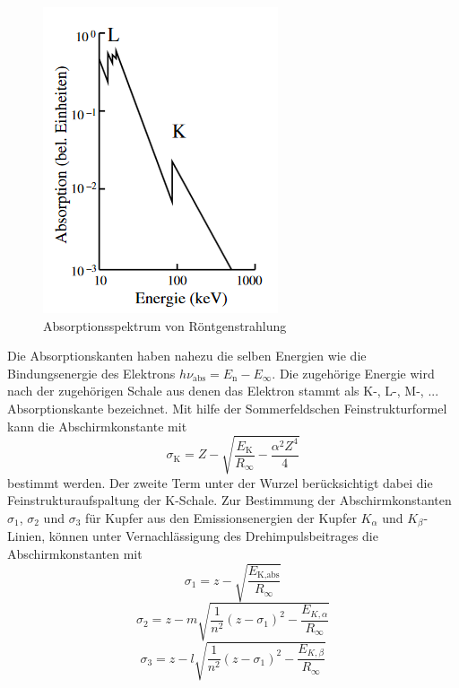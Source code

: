 \begin{figure}
    \centering
    \caption{Absorptionsspektrum von Röntgenstrahlung \cite{V602}}
    \label{fig:abso}
    \includegraphics[width = 0.6 \textwidth]{pics/abso.png}
\end{figure}
Die Absorptionskanten haben nahezu die selben Energien wie die Bindungsenergie des Elektrons $h \nu_\text{abs}= E_\text{n} - E_{\infty}$. Die zugehörige Energie wird nach der zugehörigen Schale aus denen das Elektron stammt als K-, L-, M-, ... Absorptionskante bezeichnet. 
Mit hilfe der Sommerfeldschen Feinstrukturformel kann die Abschirmkonstante mit
\begin{equation}
    \sigma_\text{K}=Z-\sqrt{\frac{E_\text{K}}{R_{\infty}}-\frac{\alpha^2 Z^4}{4}}
    \label{eqn:abschirmkonstante}
\end{equation}
bestimmt werden. Der zweite Term unter der Wurzel berücksichtigt dabei die Feinstrukturaufspaltung der K-Schale.
Zur Bestimmung der Abschirmkonstanten $\sigma_1$, $\sigma_2$ und $\sigma_3$ für Kupfer aus den Emissionsenergien der Kupfer $K_\alpha$ und $K_\beta$-Linien, können unter Vernachlässigung des Drehimpulsbeitrages die Abschirmkonstanten mit
\begin{equation}
    \sigma_1=z-\sqrt{\frac{E_\text{K,abs}}{R_\infty}}
    \label{eqn:si1}
\end{equation}
\begin{equation}
    \sigma_2=z- m \sqrt{\frac{1}{n^2} (z- \sigma_1)^2-\frac{E_{K,\alpha}}{R_\infty}}
    \label{eqn:si2}
\end{equation}
\begin{equation}
    \sigma_3=z- l \sqrt{\frac{1}{n^2} (z- \sigma_1)^2-\frac{E_{K,\beta}}{R_\infty}}
    \label{eqn:si3}
\end{equation}
